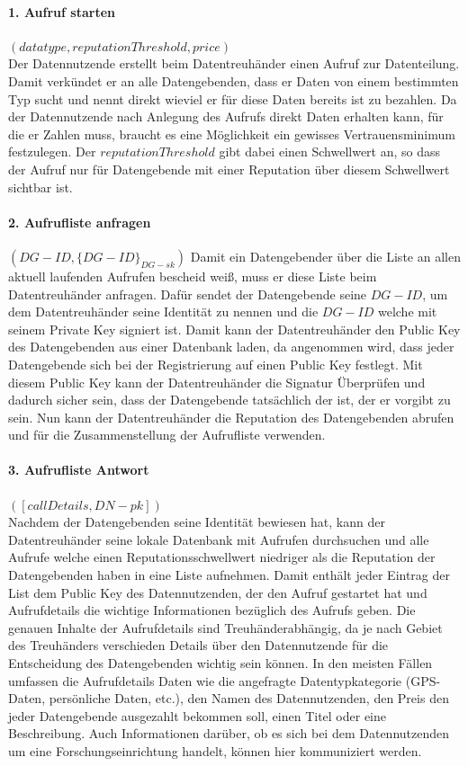 \documentclass{scrreprt}
\begin{document}
\paragraph{1. Aufruf starten} $(datatype, reputationThreshold, price)$\\
Der Datennutzende erstellt beim Datentreuhänder einen Aufruf zur Datenteilung. Damit verkündet er an alle Datengebenden, dass er Daten von einem bestimmten Typ sucht und nennt direkt wieviel er für diese Daten bereits ist zu bezahlen. Da der Datennutzende nach Anlegung des Aufrufs direkt Daten erhalten kann, für die er Zahlen muss, braucht es eine Möglichkeit ein gewisses Vertrauensminimum festzulegen. Der $reputationThreshold$ gibt dabei einen Schwellwert an, so dass der Aufruf nur für Datengebende mit einer Reputation über diesem Schwellwert sichtbar ist.


\paragraph{2. Aufrufliste anfragen} $(DG-ID, {\{DG-ID\}}_{DG-sk})$
Damit ein Datengebender über die Liste an allen aktuell laufenden Aufrufen bescheid weiß, muss er diese Liste beim Datentreuhänder anfragen. Dafür sendet der Datengebende seine $DG-ID$, um dem Datentreuhänder seine Identität zu nennen und die $DG-ID$ welche mit seinem Private Key signiert ist. Damit kann der Datentreuhänder den Public Key des Datengebenden aus einer Datenbank laden, da angenommen wird, dass jeder Datengebende sich bei der Registrierung auf einen Public Key festlegt. Mit diesem Public Key kann der Datentreuhänder die Signatur Überprüfen und dadurch sicher sein, dass der Datengebende tatsächlich der ist, der er vorgibt zu sein. Nun kann der Datentreuhänder die Reputation des Datengebenden abrufen und für die Zusammenstellung der Aufrufliste verwenden.

\paragraph{3. Aufrufliste Antwort} $([callDetails, DN-pk])$\\
Nachdem der Datengebenden seine Identität bewiesen hat, kann der Datentreuhänder seine lokale Datenbank mit Aufrufen durchsuchen und alle Aufrufe welche einen Reputationsschwellwert niedriger als die Reputation der Datengebenden haben in eine Liste aufnehmen. Damit enthält jeder Eintrag der List dem Public Key des Datennutzenden, der den Aufruf gestartet hat und Aufrufdetails die wichtige Informationen bezüglich des Aufrufs geben. Die genauen Inhalte der Aufrufdetails sind Treuhänderabhängig, da je nach Gebiet des Treuhänders verschieden Details über den Datennutzende für die Entscheidung des Datengebenden wichtig sein können. In den meisten Fällen umfassen die Aufrufdetails Daten wie die angefragte Datentypkategorie (GPS-Daten, persönliche Daten, etc.), den Namen des Datennutzenden, den Preis den jeder Datengebende ausgezahlt bekommen soll, einen Titel oder eine Beschreibung. Auch Informationen darüber, ob es sich bei dem Datennutzenden um eine Forschungseinrichtung handelt, können hier kommuniziert werden.
\end{document}
